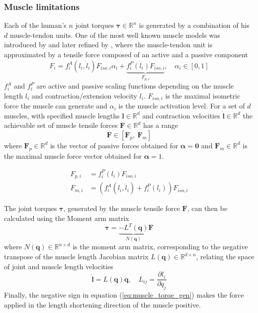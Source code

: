 \subsubsection*{Muscle limitations} Each of the human's $n$ joint torques $\bm{\tau} \in \mathbb{R}^n$ is generated by a combination of his $d$ muscle-tendon units. One of the most well known muscle models was introduced by \citet{hill1938heat} and later refined by \citet{zajac1989muscle}, where the muscle-tendon unit is approximated by a tensile force composed of an active and a passive component
\begin{equation}
    F_i = f^A_i(l_i,\dot{l}_i)F_{iso,i} \alpha_i + \underbrace{f^P_{i}(l_i)F_{iso,i}}_{F_{p,i}}, \quad \alpha_i \in \left[0, 1\right]
\end{equation}
$f^A_{i}$ and $f^P_{i}$ are active and passive scaling functions depending on the muscle length $l_i$ and contraction/extension velocity $\dot{l}_i$. $F_{iso,i}$ is the maximal isometric force the muscle can generate and $\alpha_i$ is the muscle activation level. For a set of $d$ muscles, with specified muscle lengths $\bm{l} \in \mathbb{R}^d$ and contraction velocities $\dot{\bm{l}}\in \mathbb{R}^d$ the achievable set of muscle tensile forces $\bm{F} \in\mathbb{R}^d$ has a range
\begin{equation}
    \bm{F} \in \left[ \bm{F}_{p}, ~ \bm{F}_m\right]
    \label{eq:muslce_initial_range}
\end{equation}
where $\bm{F}_p\in \mathbb{R}^d$ is the vector of passive forces obtained for $\bm{\alpha}\!=\!\bm{0}$ and $\bm{F}_m\in \mathbb{R}^d$ is the maximal muscle force vector obtained for $\bm{\alpha}\!=\!1$. 

\begin{equation}
\begin{aligned}
    F_{p,i} &= f^P_i(l_i)F_{iso,i}\\
    F_{m,i} &= \left(f^A_i(l_i,\dot{l}_i) + f^P_i(l_i)\right)F_{iso,i}
\end{aligned}
\end{equation}

The joint torques $\bm{\tau}$, generated by the muscle tensile force $\bm{F} $, can then be calculated using the Moment arm matrix \cite{pandy1994}   
\begin{equation}
    \bm{\tau} = \underbrace{-L^{T}(\bm{q})}_{N(\bm{q})}\bm{F}
    \label{eq:muscle_torqe_gen}
\end{equation}
where $N(\bm{q})\in \mathbb{R}^{n\times d}$ is the moment arm matrix, corresponding to the negative transpose of the muscle length Jacobian matrix $L(\bm{q})\in \mathbb{R}^{d\times n}$, relating the space of joint and muscle length velocities  
\begin{equation}
    \dot{\bm{l}} = L(\bm{q}) \dot{\bm{q}},\quad L_{ij}=\dfrac{\partial l_i}{\partial q_j}
    \label{eq:muscle_jacobian}
\end{equation}
Finally, the negative sign in equation (\ref{eq:muscle_torqe_gen}) makes the force applied in the length shortening direction of the muscle positive. 


